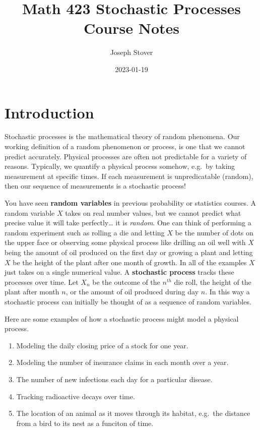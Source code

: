 \documentclass[
]{article}
\title{Math 423 Stochastic Processes Course Notes}
\author{Joseph Stover}
\date{2023-01-19}
\begin{document}
\maketitle

{
\setcounter{tocdepth}{2}
\tableofcontents
}
\hypertarget{introduction}{%
\section*{Introduction}\label{introduction}}

Stochastic processes is the mathematical theory of random phenomena. Our working definition of a random phenomenon or process, is one that we cannot predict accurately. Physical processes are often not predictable for a variety of reasons. Typically, we quantify a physical process somehow, e.g.~by taking measurement at specific times. If each measurement is unpredicatable (random), then our sequence of measurements is a stochastic process!

You have seen \textbf{random variables} in previous probability or statistics courses. A random variable \(X\) takes on real number values, but we cannot predict what precise value it will take perfectly\ldots{} it is \emph{random}. One can think of performing a random experiment such as rolling a die and letting \(X\) be the number of dots on the upper face or observing some physical process like drilling an oil well with \(X\) being the amount of oil produced on the first day or growing a plant and letting \(X\) be the height of the plant after one month of growth. In all of the examples \(X\) just takes on a single numerical value. A \textbf{stochastic process} tracks these processes over time. Let \(X_n\) be the outcome of the \(n^{th}\) die roll, the height of the plant after month \(n\), or the amount of oil produced during day \(n\). In this way a stochastic process can initially be thought of as a sequence of random variables.

Here are some examples of how a stochastic process might model a physical process.

\begin{enumerate}
\def\labelenumi{(\arabic{enumi})}
\item
  Modeling the daily closing price of a stock for one year.
\item
  Modeling the number of insurance claims in each month over a year.
\item
  The number of new infections each day for a particular disease.
\item
  Tracking radioactive decays over time.
\item
  The location of an animal as it moves through its habitat, e.g.~the distance from a bird to its nest as a funciton of time.
\end{enumerate}
\end{document}
